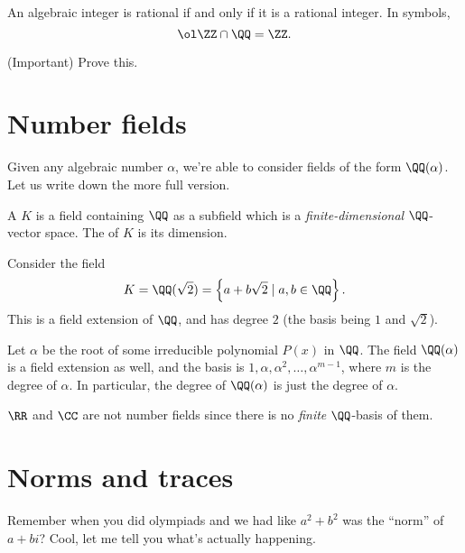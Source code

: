 \begin{proposition}
	An algebraic integer is rational if and only if it is a rational integer.
	In symbols, \[ \ol\ZZ \cap \QQ = \ZZ. \]
\end{proposition}
\begin{ques}
	(Important) Prove this.
\end{ques}

\section{Number fields}
Given any algebraic number $\alpha$, we're able to consider fields of the form $\QQ(\alpha)$. Let us write down the more full version.
\begin{definition}
	A  $K$ is a field containing $\QQ$ as a subfield
	which is a \emph{finite-dimensional} $\QQ$-vector space.
	The  of $K$ is its dimension.
\end{definition}
\begin{example}
	Consider the field
	\[ K = \QQ(\sqrt2) = \left\{ a+b\sqrt2 \mid a,b \in \QQ \right\}. \]
	This is a field extension of $\QQ$,
	and has degree $2$ (the basis being $1$ and $\sqrt2$).
\end{example}
\begin{example}
	Let $\alpha$ be the root of some irreducible polynomial $P(x)$ in $\QQ$.
	The field $\QQ(\alpha)$ is a field extension as well, and the basis
	is $1, \alpha, \alpha^2, \dots, \alpha^{m-1}$,
	where $m$ is the degree of $\alpha$.
	In particular, the degree of $\QQ(\alpha)$ is just the degree of $\alpha$.
\end{example}
\begin{example}
	$\RR$ and $\CC$ are not number fields since there is no \emph{finite}
	$\QQ$-basis of them.
\end{example}

\section{Norms and traces}
Remember when you did olympiads and we had like $a^2+b^2$ was the ``norm'' of $a+bi$?
Cool, let me tell you what's actually happening.

